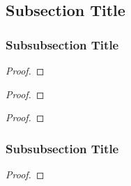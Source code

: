 \begin{rmrk}
    \lipsum[1]
\end{rmrk}

\subsection{Subsection Title}


\begin{defn}
    \lipsum[1]
\end{defn}

\begin{exmp}
    \lipsum[1]
\end{exmp}

\begin{rmrk}
    \lipsum[1]
\end{rmrk}

\subsubsection{Subsubsection Title}

\begin{lemm}
    \lipsum[1]
\end{lemm}

\begin{proof}
    \lipsum[1]
\end{proof}

\begin{thrm}
    \lipsum[1]
\end{thrm}

\begin{proof}
    \lipsum[1]
\end{proof}

\begin{coro}
    \lipsum[1]
\end{coro}

\begin{proof}
    \lipsum[1]
\end{proof}

\subsubsection{Subsubsection Title}

\begin{lemm}
    \lipsum[1]
\end{lemm}

\begin{proof}
    \lipsum[1]
\end{proof}

